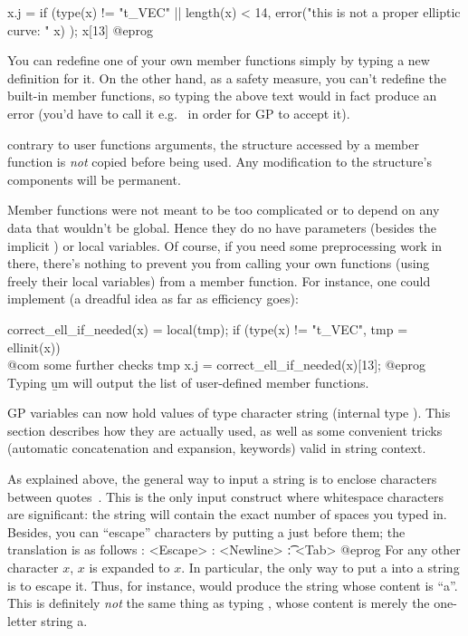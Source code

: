 \bprog
x.j =
{
  if (type(x) != "t_VEC" || length(x) < 14,
    error("this is not a proper elliptic curve: " x)
  );
  x[13]
}
@eprog

You can redefine one of your own member functions simply by typing a new
definition for it. On the other hand, as a safety measure, you can't redefine
the built-in member functions, so typing the above text would in fact produce
an error (you'd have to call it e.g.~ in order for GP to accept it).

 contrary to user functions arguments, the structure
accessed by a member function is \emph{not} copied before being used.
Any modification to the structure's components will be permanent.

 Member functions were not meant to be too complicated or to
depend on any data that wouldn't be global. Hence they do no have parameters
(besides the implicit ) or local variables. Of course, if you
need some preprocessing work in there, there's nothing to prevent you from
calling your own functions (using freely their local variables) from a member
function. For instance, one could implement (a dreadful idea as far as
efficiency goes):

\bprog
correct_ell_if_needed(x) = 
{
  local(tmp);
  if (type(x) != "t_VEC", tmp = ellinit(x))
    \\ @com some further checks
  tmp
}
x.j = correct_ell_if_needed(x)[13];
@eprog
Typing \b{um} will output the list of user-defined member functions.

\label{se:strings}

\noindent
GP variables can now hold values of type character string (internal type
). This section describes how they are actually used, as well as
some convenient tricks (automatic concatenation and expansion, keywords)
valid in string context.

As explained above, the general way to input a string is to enclose
characters between quotes~. This is the only input construct where
whitespace characters are significant: the string will contain the exact
number of spaces you typed in. Besides, you can ``escape'' characters by
putting a \kbd{\bs} just before them; the translation is as follows
\bprog
   \e: <Escape>
   \n: <Newline>
   \t: <Tab>
@eprog
For any other character $x$, \b{$x$} is expanded to $x$. In particular, the
only way to put a  into a string is to escape it. Thus, for
instance,  would produce the string whose content is
``a''. This is definitely \emph{not} the same thing as typing ,
whose content is merely the one-letter string a.

